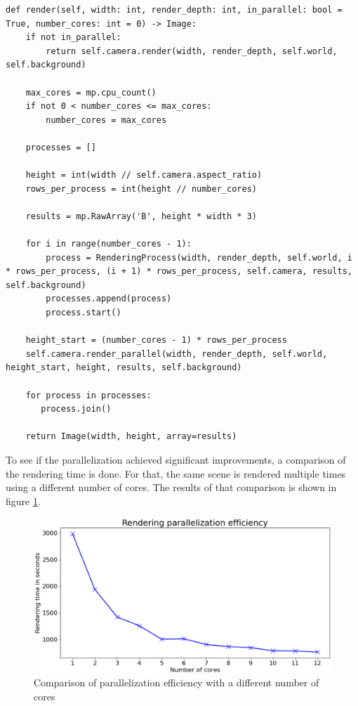 \documentclass[12pt]{report}
\begin{document}
\newpage
\begin{lstlisting}[caption={Parallelizing the rendering process}, label=lst:parallel, style=mystyle]
def render(self, width: int, render_depth: int, in_parallel: bool = True, number_cores: int = 0) -> Image:
    if not in_parallel:
        return self.camera.render(width, render_depth, self.world, self.background)

    max_cores = mp.cpu_count()
    if not 0 < number_cores <= max_cores:
        number_cores = max_cores

    processes = []
    
    height = int(width // self.camera.aspect_ratio)
    rows_per_process = int(height // number_cores)
    
    results = mp.RawArray('B', height * width * 3)
    
    for i in range(number_cores - 1):
        process = RenderingProcess(width, render_depth, self.world, i * rows_per_process, (i + 1) * rows_per_process, self.camera, results, self.background)
        processes.append(process)
        process.start()

    height_start = (number_cores - 1) * rows_per_process
    self.camera.render_parallel(width, render_depth, self.world, height_start, height, results, self.background)
    
    for process in processes:
       process.join()

    return Image(width, height, array=results)
\end{lstlisting}
\newpage
\noindent To see if the parallelization achieved significant improvements, a comparison of the rendering time is done. For that, the same scene is rendered multiple times using a different number of cores. The results of that comparison is shown in figure \ref{fig:efficiency}.
\begin{figure}[h!]
\includegraphics[width=\textwidth]{parallelization_efficiency}
\centering
\caption{Comparison of parallelization efficiency with a different number of cores}
\label{fig:efficiency}
\end{figure} \\
\end{document}
